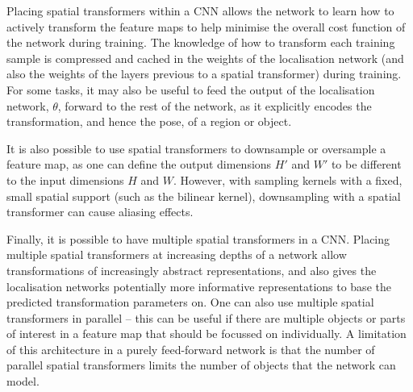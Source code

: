 \documentclass{article} %
\newcommand{\ksnote}[1]{\textbf{\MakeUppercase{TODO: #1}}}
\begin{document}
Placing spatial transformers within a CNN allows the network to learn how to
actively transform the feature maps to help minimise the overall cost function of
the network during training. The knowledge of how to transform each training
sample is compressed and cached in the weights of the localisation network (and
also the weights of the layers previous to a spatial transformer) during
training. For some
tasks, it may also be useful to feed the output of the localisation network,
$\theta$, forward to the rest of the network, as it explicitly encodes the
transformation, and hence the pose, of a region or object.

It is also possible to use spatial transformers to downsample or oversample a
feature map, as one can define the output dimensions $H'$ and $W'$ to be
different to the input dimensions $H$ and $W$. However, with sampling kernels
with a fixed, small spatial support (such as the bilinear kernel), downsampling with a
spatial transformer can cause aliasing effects.


Finally, it is possible to have multiple spatial transformers in a CNN. Placing multiple spatial transformers at increasing depths of a network allow transformations of increasingly abstract representations, and also gives the localisation networks potentially more informative representations to base the predicted transformation parameters on. One can also use multiple spatial transformers
in parallel -- this can be useful if there are multiple objects or parts of
interest in a feature map that should be focussed on individually.
A limitation of this architecture in a purely feed-forward network is that the
number of parallel spatial transformers limits the number of objects that the
network can model.
\end{document}
